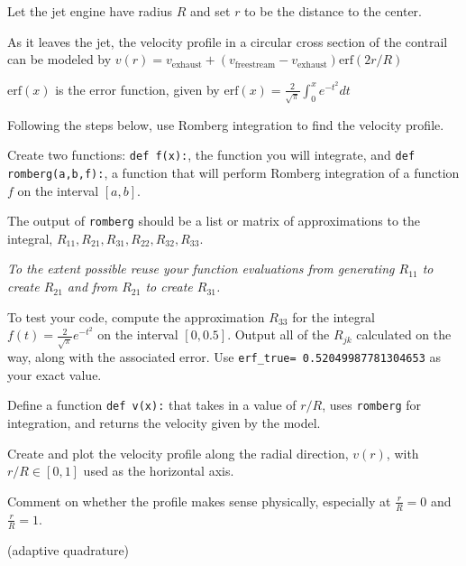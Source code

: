 \documentclass[12pt,letterpaper,noanswers]{exam}
\begin{document}
\begin{questions}
Let the jet engine have radius $R$ and set $r$ to be the distance to the center.  

As it leaves the jet, the velocity profile in a circular cross section of the contrail can be modeled by $v(r) = v_{\text{exhaust}} + (v_{\text{freestream}}-v_{\text{exhaust}})\text{erf}(2r/R)$

$\text{erf}(x)$ is the error function, given by $\displaystyle\text{erf}(x) = \frac{2}{\sqrt{\pi}}\int_0^x e^{-t^2}dt$

Following the steps below, use Romberg integration to find the velocity profile.
\begin{parts}


\item Create two functions: \texttt{def f(x):}, the function you will integrate, and \texttt{def romberg(a,b,f):}, a function that will perform Romberg integration of a function $f$ on the interval $[a,b]$.

The output of \texttt{romberg} should be a list or matrix of approximations to the integral, $R_{11}, R_{21}, R_{31}, R_{22}, R_{32}, R_{33}$.

\emph{To the extent possible reuse your function evaluations from generating $R_{11}$ to create $R_{21}$ and from $R_{21}$ to create $R_{31}$.}

\item To test your code, compute the approximation $R_{33}$ for the integral $f(t) = \frac{2}{\sqrt{\pi}}e^{-t^2}$ on the interval $[0,0.5]$.  Output all of the $R_{jk}$ calculated on the way, along with the associated error.  Use \texttt{erf\_true= 0.52049987781304653} as your exact value.  

\item Define a function \texttt{def v(x):} that takes in a value of $r/R$, uses \texttt{romberg} for integration, and returns the velocity given by the model.

Create and plot the velocity profile along the radial direction, $v(r)$, with $r/R \in[0,1]$ used as the horizontal axis.  

Comment on whether the profile makes sense physically, especially at $\frac{r}{R} = 0$ and $\frac{r}{R} = 1$.
\end{parts}


\item (adaptive quadrature) %



\end{questions}
\end{document}
